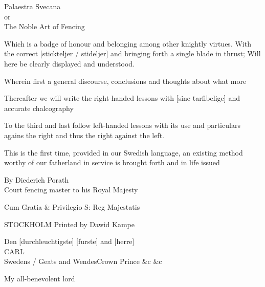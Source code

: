 \cleartoleftpage


\newpage

Palaestra Svecana \\
or \\
The Noble Art of Fencing

Which is a badge of honour and belonging among other knightly virtues. With the correct [stickteljer / stideljer] and bringing forth a single blade in thrust; Will here be clearly displayed and understood.

Wherein first a general discourse, conclusions and thoughts about what
more 

Thereafter we will write the right-handed lessons with [sine
tarfibelige] and accurate chalcography

To the third and last follow left-handed lessons with its use and particulars agains the right and thus the right against the left.


This is the first time, provided in our Swedish language, an existing
method worthy of our fatherland in service is brought forth and in
life issued

By Diederich Porath \\
Court fencing master to his Royal Majesty

Cum Gratia \& Privilegio S: Reg Majestatis

STOCKHOLM Printed by Dawid Kampe

\newpage 


\newpage

Den [durchleuchtigste] [furste] and [herre] \\
CARL \\
Swedens / Geats and WendesCrown Prince \&c \&c

My all-benevolent lord
